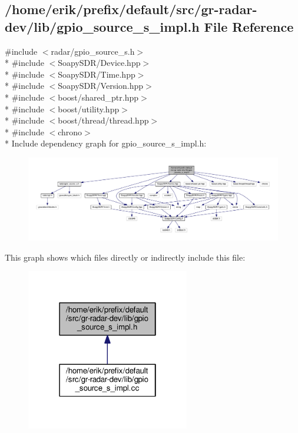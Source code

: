 \subsection{/home/erik/prefix/default/src/gr-\/radar-\/dev/lib/gpio\+\_\+source\+\_\+s\+\_\+impl.h File Reference}
\label{gpio__source__s__impl_8h}
{\ttfamily \#include $<$radar/gpio\+\_\+source\+\_\+s.\+h$>$}\\*
{\ttfamily \#include $<$Soapy\+S\+D\+R/\+Device.\+hpp$>$}\\*
{\ttfamily \#include $<$Soapy\+S\+D\+R/\+Time.\+hpp$>$}\\*
{\ttfamily \#include $<$Soapy\+S\+D\+R/\+Version.\+hpp$>$}\\*
{\ttfamily \#include $<$boost/shared\+\_\+ptr.\+hpp$>$}\\*
{\ttfamily \#include $<$boost/utility.\+hpp$>$}\\*
{\ttfamily \#include $<$boost/thread/thread.\+hpp$>$}\\*
{\ttfamily \#include $<$chrono$>$}\\*
Include dependency graph for gpio\+\_\+source\+\_\+s\+\_\+impl.\+h\+:
\nopagebreak
\begin{figure}[H]
\begin{center}
\leavevmode
\includegraphics[width=350pt]{d5/dce/gpio__source__s__impl_8h__incl}
\end{center}
\end{figure}
This graph shows which files directly or indirectly include this file\+:
\nopagebreak
\begin{figure}[H]
\begin{center}
\leavevmode
\includegraphics[width=202pt]{d9/de5/gpio__source__s__impl_8h__dep__incl}
\end{center}
\end{figure}
